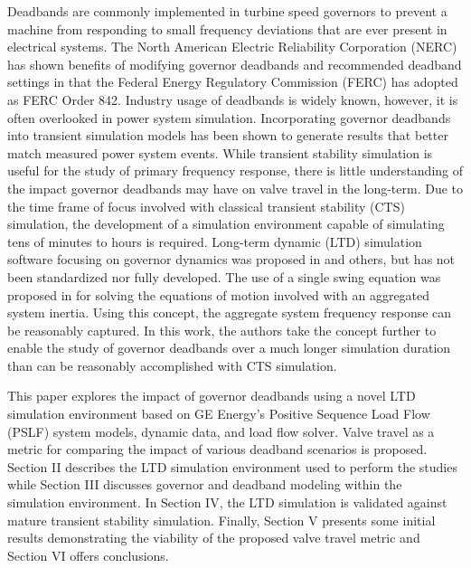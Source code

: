 %
%
Deadbands are commonly implemented in turbine speed governors to prevent a machine from responding to small frequency deviations that are ever present in electrical systems.
The North American Electric Reliability Corporation (NERC) has shown benefits of modifying governor deadbands  and recommended deadband settings in \cite{nercFRI2012} that the Federal Energy Regulatory Commission (FERC) has adopted as FERC Order 842\cite{ferc2018}.
Industry usage of deadbands is widely known, however, it is often overlooked in power system simulation.
Incorporating governor deadbands into transient simulation models has been shown to generate results that better match measured power system events\cite{kou2016}.
While transient stability simulation is useful for the study of primary frequency response, there is little understanding of the impact governor deadbands may have on valve travel in the long-term. 
Due to the time frame of focus involved with classical transient stability (CTS) simulation, the development of a simulation environment capable of simulating tens of minutes to hours is required. 
Long-term dynamic (LTD) simulation software focusing on governor dynamics was proposed in \cite{AGCCresap} and others, but has not been standardized nor fully developed.
The use of a single swing equation was proposed in \cite{Stajcar} for solving the equations of motion involved with an aggregated system inertia. 
Using this concept, the aggregate system frequency response can be reasonably captured. 
In this work, the authors take the concept further to enable the study of governor deadbands over a much longer simulation duration than can be reasonably accomplished with CTS simulation. 

This paper explores the impact of governor deadbands using a novel LTD simulation environment based on GE Energy's Positive Sequence Load Flow (PSLF) system models, dynamic data, and load flow solver. 
Valve travel as a metric for comparing the impact of various deadband scenarios is proposed. 
Section II describes the LTD simulation environment used to perform the studies while
Section III discusses governor and deadband modeling within the simulation environment. 
In Section IV, the LTD simulation is validated against mature transient stability simulation. 
Finally, Section V presents some initial results demonstrating the viability of the proposed valve travel metric and Section VI offers conclusions.